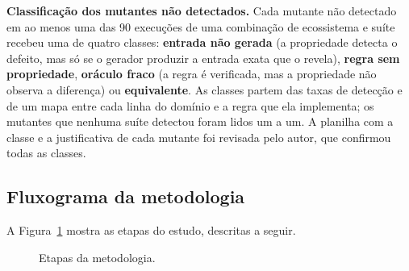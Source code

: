 \textbf{Classificação dos mutantes não detectados.} Cada mutante não detectado em ao menos uma das 90 execuções de uma combinação de ecossistema e suíte recebeu uma de quatro classes: \textbf{entrada não gerada} (a propriedade detecta o defeito, mas só se o gerador produzir a entrada exata que o revela), \textbf{regra sem propriedade}, \textbf{oráculo fraco} (a regra é verificada, mas a propriedade não observa a diferença) ou \textbf{equivalente}. As classes partem das taxas de detecção e de um mapa entre cada linha do domínio e a regra que ela implementa; os mutantes que nenhuma suíte detectou foram lidos um a um. A planilha com a classe e a justificativa de cada mutante foi revisada pelo autor, que confirmou todas as classes.

\subsection{Fluxograma da metodologia}
\label{sec:fluxo}

A Figura~\ref{fig:procedimento} mostra as etapas do estudo, descritas a seguir.

\begin{figure}[!htbp]
\centering
{}
\caption{Etapas da metodologia.}
\label{fig:procedimento}
\end{figure}

